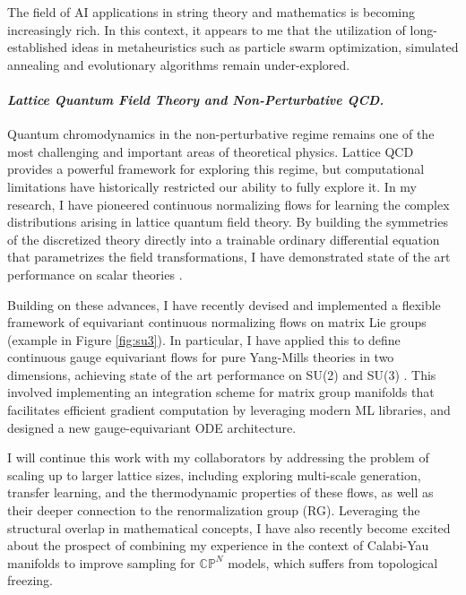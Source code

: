 \documentclass[11pt]{article}
\begin{document}
The field of AI applications in string theory and mathematics is becoming increasingly rich.
In this context, it appears to me that the utilization of long-established ideas in metaheuristics such as particle swarm optimization, simulated annealing and evolutionary algorithms remain under-explored.

\paragraph{\textit{{Lattice Quantum Field Theory and Non-Perturbative QCD.}}}
Quantum chromodynamics in the non-perturbative regime remains one of the most challenging and important areas of theoretical physics.
Lattice QCD provides a powerful framework for exploring this regime, but computational limitations have historically restricted our ability to fully explore it.
In my research, I have pioneered continuous normalizing flows for learning the complex distributions arising in lattice quantum field theory. By building the symmetries of the discretized theory directly into a trainable ordinary differential equation that parametrizes the field transformations, I have demonstrated state of the art performance on scalar theories \cite{gerdes2023LearningLattice}.

Building on these advances, I have recently devised and implemented a flexible framework of equivariant continuous normalizing flows on matrix Lie groups (example in Figure \ref{fig:su3}).
In particular, I have applied this to define continuous gauge equivariant flows for pure Yang-Mills theories in two dimensions, achieving state of the art performance on SU(2) and SU(3) \cite{gerdes2024continuousGauge}.
This involved implementing an integration scheme for matrix group manifolds that facilitates efficient gradient computation by leveraging modern ML libraries, and designed a new gauge-equivariant ODE architecture. %

\textbf{\color{royalblue}{Future Directions.}}
I will continue this work with my collaborators by addressing the problem of scaling up to larger lattice sizes, including exploring multi-scale generation, transfer learning, and the thermodynamic properties of these flows, as well as their deeper connection to the renormalization group (RG). Leveraging the structural overlap in mathematical concepts, I have also recently become excited about the prospect of combining my experience in the context of Calabi-Yau manifolds to improve sampling for $\mathbb{CP}^N$ models, which suffers from topological freezing.
\end{document}
